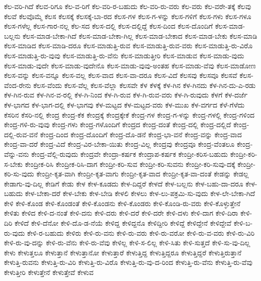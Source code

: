 {ಕೆಲ-ವರಿ-ಗಿದೆ
ಕೆಲವ-ರಿಗೂ
ಕೆಲ-ವ-ರಿಗೆ
ಕೆಲ-ವರಿ-ರ-ಬಹುದು
ಕೆಲ-ವರಿ-ರು-ವರು
ಕೆಲ-ವರು
ಕೆಲ-ವರೇ-ತಕ್ಕೆ
ಕೆಲವು
ಕೆಲವೆ
ಕೆಲವೊಮ್ಮೆ
ಕೆಲಸ
ಕೆಲಸಕ್ಕೆ
ಕೆಲಸಕ್ಕೆ-ಬಾ-ರದ
ಕೆಲಸ-ಗಳ
ಕೆಲಸ-ಗ-ಳನ್ನು
ಕೆಲಸ-ಗಳಿಗೆ
ಕೆಲಸ-ಗಳು
ಕೆಲಸ-ಗಳೂ
ಕೆಲಸ-ಗಳೆಲ್ಲ
ಕೆಲಸ-ಗಾರ-ನಲ್ಲ
ಕೆಲ-ಸದ
ಕೆಲಸ-ದಲ್ಲಿ
ಕೆಲಸ-ದಲ್ಲಿದ್ದೆ
ಕೆಲಸ-ದಿಂದ
ಕೆಲಸ-ದೊಂದಿಗೆ
ಕೆಲಸ-ಮಾಡ-ಬಲ್ಲನು
ಕೆಲಸ-ಮಾಡ-ಬೇಕಾ-ಗಿದೆ
ಕೆಲಸ-ಮಾಡ-ಬೇಕಾ-ಗಿಲ್ಲ
ಕೆಲಸ-ಮಾಡ-ಬೇಕಾದ
ಕೆಲಸ-ಮಾಡ-ಬೇಕು
ಕೆಲಸ-ಮಾಡಿ
ಕೆಲಸ-ಮಾಡಿದ
ಕೆಲಸ-ಮಾಡಿ-ದರೂ
ಕೆಲಸ-ಮಾಡುತ್ತಿ-ರುವ
ಕೆಲಸ-ಮಾಡುತ್ತಿ-ರುವ-ವರು
ಕೆಲಸ-ಮಾಡುತ್ತಿ-ರು-ವಿರೊ
ಕೆಲಸ-ಮಾಡುತ್ತಿ-ರು-ವುವು
ಕೆಲಸ-ಮಾಡುತ್ತಿ-ರು-ವೆನು
ಕೆಲಸ-ಮಾಡುತ್ತೀರಿ
ಕೆಲಸ-ಮಾಡುವ
ಕೆಲಸ-ಮಾಡು-ವುದು
ಕೆಲಸ-ಮಾಡು-ವುದೇ
ಕೆಲಸ-ಮಾಡು-ವುದೇನೊ
ಕೆಲಸ-ಮಾಡು-ವುವು-ಅಂತಹ
ಕೆಲಸ-ಮಾಡು-ವೆವು
ಕೆಲಸ-ಮಾಡೋಣ
ಕೆಲಸ-ವನ್ನು
ಕೆಲಸ-ವನ್ನೂ
ಕೆಲಸ-ವಲ್ಲ
ಕೆಲಸ-ವಾದ
ಕೆಲಸ-ವಾ-ದರೂ
ಕೆಲಸ-ವಿದೆ
ಕೆಲಸವು
ಕೆಲಸವೂ
ಕೆಲಸವೆ
ಕೆಲಸ-ವೆಂದ-ರೇನು
ಕೆಲಸ-ವೆಂದು
ಕೆಲಸ-ವೆಲ್ಲ
ಕೆಲಸ-ವೆಲ್ಲಾ
ಕೆಲಸವೇ
ಕೆಳ
ಕೆಳಕ್ಕೆ
ಕೆಳ-ಗಿನ
ಕೆಳ-ಗಿನದು
ಕೆಳ-ಗಿನ-ದು-ಎ-ರಡು
ಕೆಳ-ಗಿನ-ರುವ
ಕೆಳ-ಗಿನ-ವ-ರಲ್ಲಿ
ಕೆಳ-ಗಿ-ನಿಂದ
ಕೆಳ-ಗಿ-ರುವ
ಕೆಳ-ಗಿ-ರುವ-ವರು
ಕೆಳ-ಗಿ-ರುವುದು
ಕೆಳಗೆ
ಕೆಳ-ದರ್ಜೆ
ಕೆಳ-ಭಾಗದ
ಕೆಳ-ಭಾಗ-ದಲ್ಲಿ
ಕೆಳ-ಭಾಗವು
ಕೆಳ-ಮಟ್ಟದ
ಕೆಳ-ಮಟ್ಟದ-ವರು
ಕೆಳ-ಮುಖ
ಕೆಳ-ವರ್ಗದ
ಕೆಳೆ-ಗೆಳೆದು
ಕೆಸರಿನ
ಕೆಸರಿ-ನಲ್ಲಿ
ಕೇಂದ್ರ
ಕೇಂದ್ರ-ಕೆಕ
ಕೇಂದ್ರಕ್ಕೆ
ಕೇಂದ್ರಕ್ಕೇಕೆ
ಕೇಂದ್ರ-ಗಳ
ಕೇಂದ್ರ-ಗ-ಳನ್ನು
ಕೇಂದ್ರ-ಗಳಲ್ಲಿ
ಕೇಂದ್ರ-ಗಳಿಂದ
ಕೇಂದ್ರ-ಗಳಿ-ರು-ವುವು
ಕೇಂದ್ರ-ಗಳು
ಕೇಂದ್ರ-ಗಳೊಂದಿಗೆ
ಕೇಂದ್ರದ
ಕೇಂದ್ರ-ದಂತೆ
ಕೇಂದ್ರ-ದಲ್ಲಿ
ಕೇಂದ್ರ-ದಲ್ಲಿದೆ
ಕೇಂದ್ರ-ದಲ್ಲಿ-ರುವ-ವನೆ
ಕೇಂದ್ರ-ದಿಂದ
ಕೇಂದ್ರ-ದೊಂದಿಗೆ
ಕೇಂದ್ರ-ದೊ-ಡನೆ
ಕೇಂದ್ರ-ಭಾ-ವನೆ
ಕೇಂದ್ರ-ವನ್ನು
ಕೇಂದ್ರ-ವಾದ
ಕೇಂದ್ರ-ವಾ-ದರೆ
ಕೇಂದ್ರ-ವಿದೆ
ಕೇಂದ್ರ-ವಿರ-ಬೇಕಾ-ಯಿತು
ಕೇಂದ್ರ-ವಿಲ್ಲ
ಕೇಂದ್ರವು
ಕೇಂದ್ರವೂ
ಕೇಂದ್ರ-ವೆಂತಲೂ
ಕೇಂದ್ರ-ವೆನ್ನು-ವನು
ಕೇಂದ್ರ-ವೆಲ್ಲಿ-ರುವುದು
ಕೇಂದ್ರವೇ
ಕೇಂದ್ರಾ-ಕರ್ಷಕ
ಕೇಂದ್ರಾಪ-ಕರ್ಷಕ
ಕೇಂದ್ರೀ-ಕರಿಸ-ಬಹುದು
ಕೇಂದ್ರೀ-ಕರಿ-ಸ-ಬೇಕು
ಕೇಂದ್ರೀಕ-ರಿಸಿ
ಕೇಂದ್ರೀಕ-ರಿಸಿ-ದಾಗ
ಕೇಂದ್ರೀ-ಕರಿ-ಸುವ
ಕೇಂದ್ರೀ-ಕರಿ-ಸುವನು
ಕೇಂದ್ರೀ-ಕರಿ-ಸುವು-ದಕ್ಕೆ
ಕೇಂದ್ರೀ-ಕರಿ-ಸು-ವುದು
ಕೇಂದ್ರೀ-ಕೃತ-ವಾಗಿ
ಕೇಂದ್ರೀ-ಕೃತ-ವಾಗು
ಕೇಂದ್ರೀ-ಕೃತ-ವಾದ
ಕೇಂದ್ರೀ-ಕೃತ-ವಾ-ದಂತೆ
ಕೇಡನ್ನು
ಕೇಡಲ್ಲ
ಕೇಡಾಗು-ವು-ದಿಲ್ಲ
ಕೇಡಿಗೆ
ಕೇಡು
ಕೇಳ
ಕೇಳ-ಕೂಡದು
ಕೇಳ-ದಿದ್ದರೆ
ಕೇಳದೆ
ಕೇಳ-ಬಲ್ಲನು
ಕೇಳ-ಬಹು-ದಾ-ದರೂ
ಕೇಳ-ಬಹುದು
ಕೇಳ-ಬೇಕಾ-ದರೆ
ಕೇಳ-ಬೇಕು
ಕೇಳ-ಬೇಡಿ
ಕೇಳಲಿ
ಕೇಳಲು
ಕೇಳ-ಲು-ಪಕ್ರಮಿ-ಸು-ವುದು
ಕೇಳ-ಲೇ-ಬೇಕಾ-ಗಿದೆ
ಕೇಳಿ
ಕೇಳಿ-ಕೊಂಡ
ಕೇಳಿ-ಕೊಂಡಂತೆ
ಕೇಳಿ-ಕೊಂಡನು
ಕೇಳಿ-ಕೊಂಡರು
ಕೇಳಿ-ಕೊಂಡಿ-ರು-ವರು
ಕೇಳಿ-ಕೊಳ್ಳುತ್ತೇನೆ
ಕೇಳಿತು
ಕೇಳಿದ
ಕೇಳಿ-ದ-ನಂತೆ
ಕೇಳಿ-ದನು
ಕೇಳಿ-ದರು
ಕೇಳಿ-ದರೆ
ಕೇಳಿ-ದರೇ
ಕೇಳಿ-ದಳು
ಕೇಳಿ-ದಾಗ
ಕೇಳಿ-ದಿರಾ
ಕೇಳಿ-ದಿರಿ
ಕೇಳಿದೆ
ಕೇಳಿ-ದೆನೋ
ಕೇಳಿ-ದೊ-ಡ-ನೆಯೆ
ಕೇಳಿದ್ದ
ಕೇಳಿದ್ದನೊ
ಕೇಳಿದ್ದೀರಿ
ಕೇಳಿದ್ದೆ
ಕೇಳಿದ್ದೇನೆ
ಕೇಳಿದ್ದೇವೆ
ಕೇಳಿ-ಬ-ರು-ವುದು
ಕೇಳಿ-ರ-ಬಹುದು
ಕೇಳಿರು
ಕೇಳಿ-ರು-ವನು
ಕೇಳಿ-ರು-ವರು
ಕೇಳಿ-ರು-ವರೋ
ಕೇಳಿ-ರು-ವ-ವರು
ಕೇಳಿ-ರು-ವಿರಿ
ಕೇಳಿ-ರು-ವು-ದನ್ನು
ಕೇಳಿ-ರು-ವೆನು
ಕೇಳಿ-ರು-ವೆವು
ಕೇಳಿಲ್ಲ
ಕೇಳಿ-ಸ-ಲಿಲ್ಲ
ಕೇಳಿ-ಸಿತು
ಕೇಳಿ-ಸುತ್ತದೆ
ಕೇಳಿ-ಸು-ವು-ದಿಲ್ಲ
ಕೇಳು
ಕೇಳುತ್ತಲೂ
ಕೇಳುತ್ತಾನೆ
ಕೇಳುತ್ತಾನೋ
ಕೇಳುತ್ತಾರೆ
ಕೇಳುತ್ತಿದ್ದ
ಕೇಳುತ್ತಿದ್ದರೂ
ಕೇಳುತ್ತಿದ್ದರೆ
ಕೇಳುತ್ತಿರುತ್ತಾನೆ
ಕೇಳುತ್ತಿ-ರುವನು
ಕೇಳುತ್ತಿ-ರು-ವಿರಿ
ಕೇಳುತ್ತಿ-ರು-ವಿರೊ
ಕೇಳುತ್ತಿ-ರು-ವು-ದ-ರಿಂದ
ಕೇಳುತ್ತಿ-ರು-ವೆನು
ಕೇಳುತ್ತಿ-ರು-ವೆವು
ಕೇಳುತ್ತೀರಿ
ಕೇಳುತ್ತೇನೆ
ಕೇಳುತ್ತೇವೆ
ಕೇಳುವ
}

